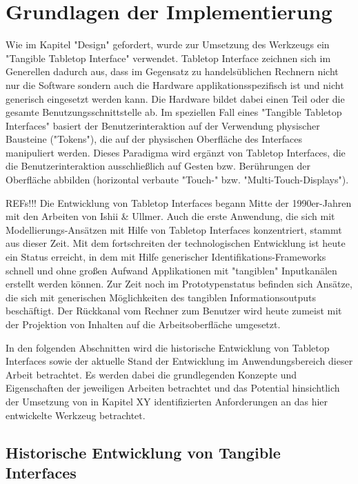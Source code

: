 \chapter{Grundlagen der Implementierung} %
\label{cha:implementierung_Überblick}

Wie im Kapitel "Design" gefordert, wurde zur Umsetzung des Werkzeugs ein "Tangible Tabletop Interface" verwendet. Tabletop Interface zeichnen sich im Generellen dadurch aus, dass im Gegensatz zu handelsüblichen Rechnern nicht nur die Software sondern auch die Hardware applikationsspezifisch ist und nicht generisch eingesetzt werden kann. Die Hardware bildet dabei einen Teil oder die gesamte Benutzungsschnittstelle ab. Im speziellen Fall eines "Tangible Tabletop Interfaces" basiert der Benutzerinteraktion auf der Verwendung physischer Bausteine ("Tokens"), die auf der physischen Oberfläche des Interfaces manipuliert werden. Dieses Paradigma wird ergänzt von Tabletop Interfaces, die die Benutzerinteraktion ausschließlich auf Gesten bzw. Berührungen der Oberfläche abbilden (horizontal verbaute "Touch-" bzw. "Multi-Touch-Displays").

REFs!!! Die Entwicklung von Tabletop Interfaces begann Mitte der 1990er-Jahren mit den Arbeiten von Ishii \& Ullmer. Auch die erste Anwendung, die sich mit Modellierungs-Ansätzen mit Hilfe von Tabletop Interfaces konzentriert, stammt aus dieser Zeit. Mit dem fortschreiten der technologischen Entwicklung ist heute ein Status erreicht, in dem mit Hilfe generischer Identifikations-Frameworks schnell und ohne großen Aufwand Applikationen mit "tangiblen" Inputkanälen erstellt werden können. Zur Zeit noch im Prototypenstatus befinden sich Ansätze, die sich mit generischen Möglichkeiten des tangiblen Informationsoutputs beschäftigt. Der Rückkanal vom Rechner zum Benutzer wird heute zumeist mit der Projektion von Inhalten auf die Arbeitsoberfläche umgesetzt.

In den folgenden Abschnitten wird die historische Entwicklung von Tabletop Interfaces sowie der aktuelle Stand der Entwicklung im Anwendungsbereich dieser Arbeit betrachtet. Es werden dabei die grundlegenden Konzepte und Eigenschaften der jeweiligen Arbeiten betrachtet und das Potential hinsichtlich der Umsetzung von in Kapitel XY identifizierten Anforderungen an das hier entwickelte Werkzeug betrachtet. 

\section{Historische Entwicklung von Tangible Interfaces} %
\label{sec:entwicklung_tangible_interfaces}

